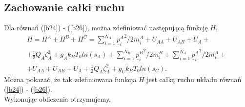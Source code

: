 \documentclass[12pt,a4paper,openright]{report} %
\begin{document}
\subsection{Zachowanie całki ruchu}
%
Dla równań (\ref{b24}) - (\ref{b26}), można zdefiniować następującą funkcję $H$,
\begin{equation}
\begin{gathered}
H=H^A+H^B+H^C=\sum_{i=1}^{N_A} {\underline{p}^A_i}^2/2m_i^A+U_{AA}+U_{AB}+U_A + \\
+ \frac{1}{2} Q_A \zeta^2_A+ g_A k_B T_0 ln(s_A) + \sum_{i=1}^{N_B}{\underline{p}^B_i}^2/2m_i^B+ \sum_{i=1}^{N_A} {\underline{p}^A_i}^2/2m_i^A+\\
+ U_{AA}+U_{AB}+U_A + \frac{1}{2} Q_A \zeta^2_A + g_C k_B T_0 ln(s_C).
\end{gathered}
\label{calka_mod_NH}
\end{equation}
Można pokazać, że tak zdefiniowana funkcja $H$ jest całką ruchu układu równań \\(\ref{b24}) - (\ref{b26}). 
\\
Wykonując obliczenia otrzymujemy,
\end{document}
